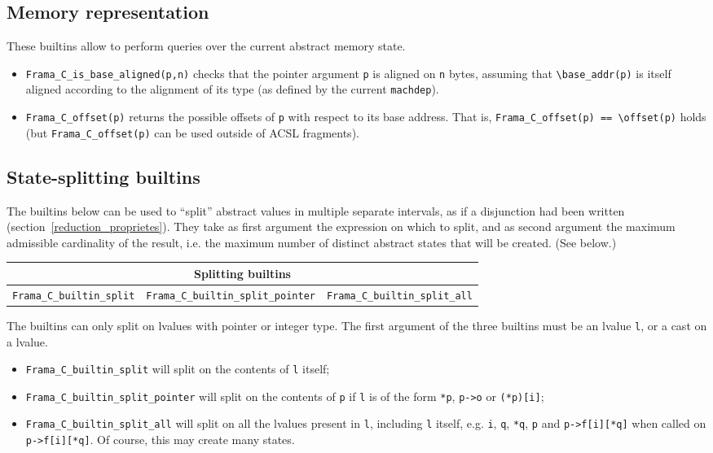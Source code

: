 \documentclass{frama-c-book}
\begin{document}
\subsection{Memory representation}
These builtins allow to perform queries over the current abstract memory state.
\begin{itemize}
\item \lstinline|Frama_C_is_base_aligned(p,n)| checks that the pointer argument
  \lstinline|p| is aligned on \lstinline|n| bytes, assuming that
  \lstinline|\base_addr(p)| is itself aligned according to the alignment
  of its type (as defined by the current \lstinline+machdep+).
\item \lstinline|Frama_C_offset(p)| returns the possible offsets of
  \lstinline|p| with respect to its base address. That is,
  \lstinline|Frama_C_offset(p) == \offset(p)| holds (but
  \lstinline|Frama_C_offset(p)| can be used outside of ACSL fragments).
\end{itemize}

\subsection{State-splitting builtins}

The builtins below can be used to ``split'' abstract values in
multiple separate intervals, as if a disjunction had been written
(section~\ref{reduction_proprietes}). They take as
first argument the expression on which to split, and as second
argument the maximum admissible cardinality of the result, i.e. the
maximum number of distinct abstract states that will be created.
(See below.)
\begin{table}[!ht]
  \centering
  \begin{tabular}{ccc}
    \multicolumn{3}{c}{Splitting builtins} \\
    \hline
    \lstinline|Frama_C_builtin_split| &
    \lstinline|Frama_C_builtin_split_pointer| &
    \lstinline|Frama_C_builtin_split_all| \\
  \end{tabular}
\end{table}

The builtins can only split on lvalues with pointer or integer type.
The first argument of the three builtins must be an lvalue
\lstinline+l+, or a cast on a lvalue.
\begin{itemize}
\item  \lstinline+Frama_C_builtin_split+ will split on the contents of
\lstinline+l+ itself;

\item  \lstinline+Frama_C_builtin_split_pointer+ will split on the contents of
\lstinline+p+ if \lstinline+l+ is of the form \lstinline+*p+, \lstinline+p->o+
or \lstinline+(*p)[i]+;

\item \lstinline+Frama_C_builtin_split_all+ will split on all the
  lvalues present in \lstinline+l+, including \lstinline+l+ itself,
  e.g.  \lstinline+i+, \lstinline+q+, \lstinline+*q+, \lstinline+p+
  and \lstinline+p->f[i][*q]+ when called on
  \lstinline+p->f[i][*q]+. Of course, this may create many states.

\end{itemize}
\end{document}
